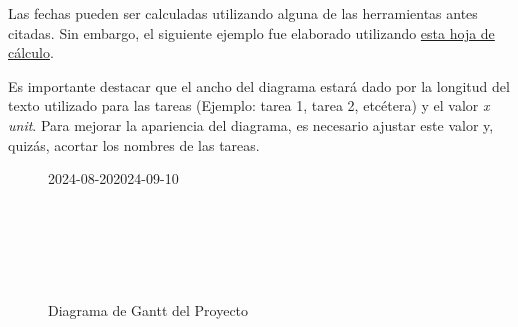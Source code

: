 Las fechas pueden ser calculadas utilizando alguna de las herramientas antes
citadas. Sin embargo, el siguiente ejemplo fue elaborado utilizando
\href{https://docs.google.com/spreadsheets/d/1fBz8NhSpc4tkkhz3KjJCbh1nR_ltDkfEcZi4tZXduqs}{esta
	hoja de cálculo}.

Es importante destacar que el ancho del diagrama estará dado por la longitud
del texto utilizado para las tareas (Ejemplo: tarea 1, tarea 2, etcétera) y el
valor \textit{x unit}. Para mejorar la apariencia del diagrama, es necesario
ajustar este valor y, quizás, acortar los nombres de las tareas.

\begin{landscape}
	\begin{figure}[htpb]
		\begin{center}
			\begin{ganttchart}[
					time slot unit=day,
					time slot format=isodate,
					x unit=0.5cm, %
					y unit title=0.7cm, %
					y unit chart=0.7cm, %
					milestone/.append style={xscale=4},
					vgrid,
					hgrid,
				]{2024-08-20}{2024-09-10}
				 \\
				 \\
				 \\

				 \\
				 \\
				 \\
			\end{ganttchart}
		\end{center}
		\caption{Diagrama de Gantt del Proyecto}
		\label{fig:gantt1}
	\end{figure}
\end{landscape}

